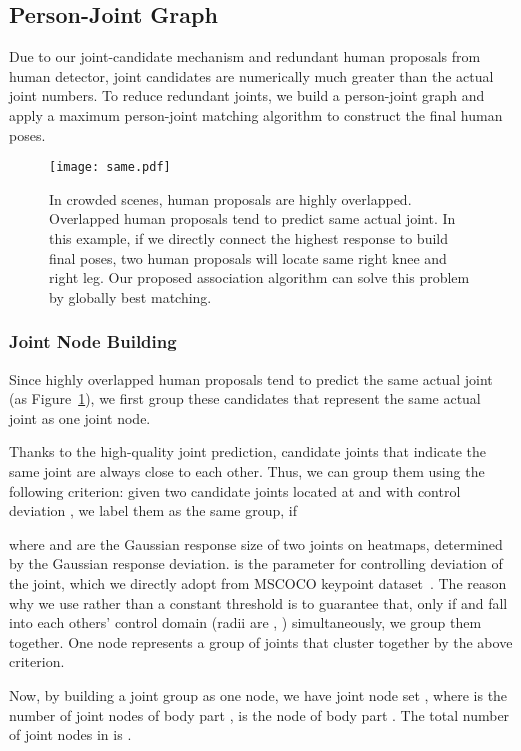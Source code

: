 \documentclass[10pt,twocolumn,letterpaper]{article}
\begin{document}
\subsection{Person-Joint Graph} \label{sec:graph}
Due to our joint-candidate mechanism and redundant human proposals from human detector, joint candidates are numerically much greater than the actual joint numbers. To reduce redundant joints, we build a person-joint graph and apply a maximum person-joint matching algorithm to construct the final human poses. \begin{figure}[htb]
\begin{center}
\texttt{[image: same.pdf]}
\end{center}
   \caption{In crowded scenes, human proposals are highly overlapped. Overlapped human proposals tend to predict same actual joint. In this example, if we directly connect the highest response to build final poses, two human proposals will locate same right knee and right leg. Our proposed association algorithm can solve this problem by globally best matching.}
\label{fig:exm}
\end{figure}

\vspace{-0.2in}
\subsubsection{Joint Node Building}\label{sec:joint_node} Since highly overlapped human proposals tend to predict the same actual joint (as Figure~\ref{fig:exm}), we first group these candidates that represent the same actual joint as one joint node.

Thanks to the high-quality joint prediction, candidate joints that indicate the same joint are always close to each other. Thus, we can group them using the following criterion: given two candidate joints located at  and  with control deviation , we label them as the same group, if

where  and  are the Gaussian response size of two joints on heatmaps, determined by the Gaussian response deviation.  is the parameter for controlling deviation of the  joint, which we directly adopt from MSCOCO keypoint dataset~\cite{mscoco}. The reason why we use  rather than a constant threshold is to guarantee that, only if  and  fall into each others' control domain (radii are , ) simultaneously, we group them together. One node represents a group of joints that cluster together by the above criterion.

Now, by building a joint group as one node, we have joint node set , where  is the number of joint nodes of body part ,  is the  node of body part . The total number of joint nodes in  is . 
\end{document}
